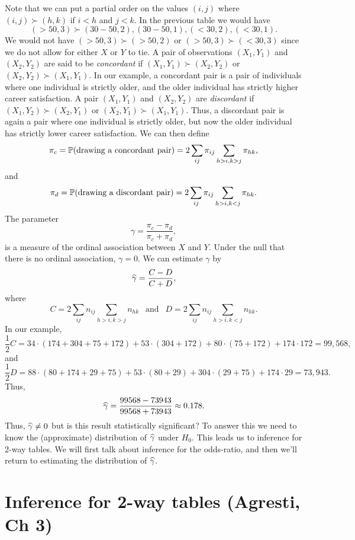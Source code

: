 Note that we can put a partial order on the values $(i,j)$ where $(i,j) \succ (h,k)$ if $i < h$ and $j < k$. In the previous table we would have 
\[(>50,3) \succ (30-50, 2), (30-50, 1), (<30, 2), (<30, 1). \]
We would not have $(>50,3) \succ (>50,2)$ or $(>50,3) \succ (<30,3)$ since we do not allow for either $X$ or $Y$ to tie. A pair of observations $(X_1,Y_1)$ and $(X_2,Y_2)$ are said to be \emph{concordant} if $(X_1,Y_1) \succ (X_2,Y_2)$ or $(X_2, Y_2) \succ (X_1,Y_1)$. In our example, a concordant pair is a pair of individuals where one individual is strictly older, and the older individual has strictly higher career satisfaction. A pair $(X_1,Y_1)$ and $(X_2,Y_2)$ are \emph{discordant} if $(X_1,Y_2) \succ (X_2, Y_1)$  or $(X_2, Y_1) \succ (X_1,Y_1)$. Thus, a discordant pair is again a pair where one individual is strictly older, but now the older individual has strictly lower career satisfaction. We can then define
\[\pi_c = {\mathbb{P}}(\text{drawing a concordant pair}) = 2\sum_{ij}\pi_{ij} \sum_{h>i,k>j}\pi_{hk},\]
and 
\[\pi_d = {\mathbb{P}}(\text{drawing a discordant pair}) = 2\sum_{ij}\pi_{ij} \sum_{h > i, k<j} \pi_{hk}. \]
The parameter
\[\gamma = \frac{\pi_c-\pi_d}{\pi_c+\pi_d}, \]
is a measure of the ordinal association between $X$ and $Y$. Under the null that there is no ordinal association, $\gamma = 0$. We can estimate $\gamma$ by 
\[\widehat{\gamma} = \frac{C-D}{C+D}, \]
where
\[C = 2\sum_{ij}n_{ij} \sum_{h>i,k>j}n_{hk} ~~\text{ and }~~ D = 2\sum_{ij}n_{ij} \sum_{h > i, k<j} n_{hk}.  \]
In our example,
\[\frac{1}{2}C = 34\cdot(174+304+75+172)+53\cdot(304+172)+80\cdot(75+172)+174\cdot 172 = 99,568,\]
and
\[\frac{1}{2}D = 88\cdot(80+174+29+75)+53\cdot(80+29)+304\cdot(29+75)+174\cdot29 = 73,943. \]
Thus,
\[\widehat{\gamma} = \frac{99568-73943}{99568+73943}\approx 0.178.  \]
Thus, $\widehat{\gamma} \neq 0$ but is this result statistically significant? To answer this we need to know the (approximate) distribution of $\widehat{\gamma}$ under $H_0$. This leads us to inference for 2-way tables. We will first talk about inference for the odds-ratio, and then we'll return to estimating the distribution of $\widehat{\gamma}$.
\section{Inference for 2-way tables (Agresti, Ch 3)}
